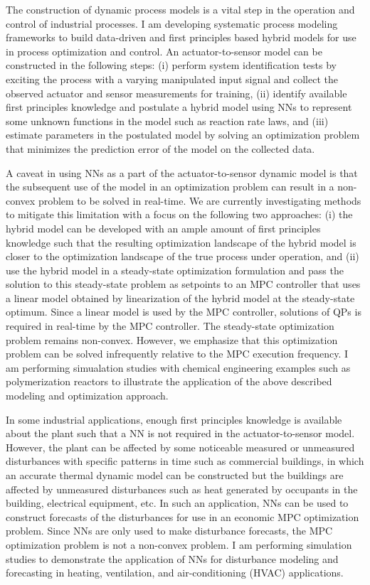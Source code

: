 \documentclass[11pt, a4paper]{article} %
\begin{document}
The construction of dynamic process models is a vital step in the operation and
control of industrial processes. I am developing systematic process modeling
frameworks to build data-driven and first principles based hybrid models for use
in process optimization and control. An actuator-to-sensor model can be
constructed in the following steps: (i) perform system identification tests by
exciting the process with a varying manipulated input signal and collect the
observed actuator and sensor measurements for training, (ii) identify available
first principles knowledge and postulate a hybrid model using NNs to represent
some unknown functions in the model such as reaction rate laws, and (iii)
estimate parameters in the postulated model by solving an optimization problem
that minimizes the prediction error of the model on the collected data.

A caveat in using NNs as a part of the actuator-to-sensor dynamic model is that
the subsequent use of the model in an optimization problem can result in a
non-convex problem to be solved in real-time. We are currently investigating
methods to mitigate this limitation with a focus on the following two
approaches: (i) the hybrid model can be developed with an ample amount of first
principles knowledge such that the resulting optimization landscape of the
hybrid model is closer to the optimization landscape of the true process under
operation, and (ii) use the hybrid model in a steady-state optimization
formulation and pass the solution to this steady-state problem as setpoints to
an MPC controller that uses a linear model obtained by linearization of the
hybrid model at the steady-state optimum. Since a linear model is used by the
MPC controller, solutions of QPs is required in real-time by the MPC controller.
The steady-state optimization problem remains non-convex. However, we emphasize
that this optimization problem can be solved infrequently relative to the MPC
execution frequency. I am performing simualation studies with chemical
engineering examples such as polymerization reactors to illustrate the
application of the above described modeling and optimization approach.

In some industrial applications, enough first principles knowledge is available
about the plant such that a NN is not required in the actuator-to-sensor model.
However, the plant can be affected by some noticeable measured or unmeasured
disturbances with specific patterns in time such as commercial buildings, in
which an accurate thermal dynamic model can be constructed but the buildings are
affected by unmeasured disturbances such as heat generated by occupants in the
building, electrical equipment, etc. In such an application, NNs can be used to
construct forecasts of the disturbances for use in an economic MPC optimization
problem. Since NNs are only used to make disturbance forecasts, the MPC
optimization problem is not a non-convex problem. I am performing simulation
studies to demonstrate the application of NNs for disturbance modeling and
forecasting in heating, ventilation, and air-conditioning (HVAC) applications.
\end{document}
